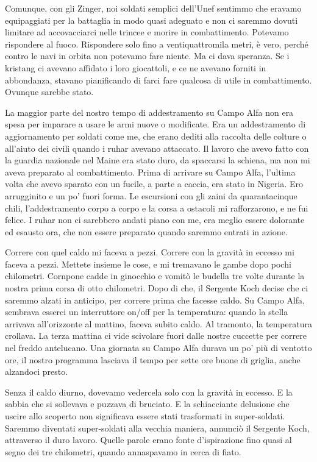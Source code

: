 Comunque, con gli Zinger, noi soldati semplici dell'Unef sentimmo che
eravamo equipaggiati per la battaglia in modo quasi adeguato e non ci
saremmo dovuti limitare ad accovacciarci nelle trincee e morire in
combattimento. Potevamo rispondere al fuoco. Rispondere solo fino a
ventiquattromila metri, è vero, perché contro le navi in orbita non
potevamo fare niente. Ma ci dava speranza. Se i kristang ci avevano
affidato i loro giocattoli, e ce ne avevano forniti in abbondanza,
stavano pianificando di farci fare qualcosa di utile in combattimento.
Ovunque sarebbe stato.

\hfill\break

La maggior parte del nostro tempo di addestramento su Campo Alfa non era
spesa per imparare a usare le armi nuove o modificate. Era un
addestramento di aggiornamento per soldati come me, che erano dediti
alla raccolta delle colture o all'aiuto dei civili quando i ruhar
avevano attaccato. Il lavoro che avevo fatto con la guardia nazionale
nel Maine era stato duro, da spaccarsi la schiena, ma non mi aveva
preparato al combattimento. Prima di arrivare su Campo Alfa, l'ultima
volta che avevo sparato con un fucile, a parte a caccia, era stato in
Nigeria. Ero arrugginito e un po' fuori forma. Le escursioni con gli
zaini da quarantacinque chili, l'addestramento corpo a corpo e la corsa
a ostacoli mi rafforzarono, e ne fui felice. I ruhar non ci sarebbero
andati piano con me, era meglio essere dolorante ed esausto ora, che non
essere preparato quando saremmo entrati in azione.

Correre con quel caldo mi faceva a pezzi. Correre con la gravità in
eccesso mi faceva a pezzi. Mettete insieme le cose, e mi tremavano le
gambe dopo pochi chilometri. Cornpone cadde in ginocchio e vomitò le
budella tre volte durante la nostra prima corsa di otto chilometri. Dopo
di che, il Sergente Koch decise che ci saremmo alzati in anticipo, per
correre prima che facesse caldo. Su Campo Alfa, sembrava esserci un
interruttore on/off per la temperatura: quando la stella arrivava
all'orizzonte al mattino, faceva subito caldo. Al tramonto, la
temperatura crollava. La terza mattina ci vide scivolare fuori dalle
nostre cuccette per correre nel freddo antelucano. Una giornata su Campo
Alfa durava un po' più di ventotto ore, il nostro programma lasciava il
tempo per sette ore buone di griglia, anche alzandoci presto.

Senza il caldo diurno, dovevamo vedercela solo con la gravità in
eccesso. E la sabbia che si sollevava e puzzava di bruciato. E la
schiacciante delusione che uscire allo scoperto non significava essere
stati trasformati in super-soldati. Saremmo diventati super-soldati alla
vecchia maniera, annunciò il Sergente Koch, attraverso il duro lavoro.
Quelle parole erano fonte d'ispirazione fino quasi al segno dei tre
chilometri, quando annaspavamo in cerca di fiato.

